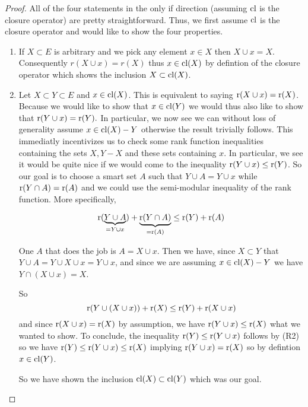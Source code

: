 \begin{proof}
    All of the four statements in the only if direction (assuming $\mathrm{cl}$ is the closure operator) are pretty straightforward. 
    Thus, we first assume $\mathrm{cl}$ is the closure operator and would like to show the four properties.

    \begin{enumerate}
        \item If $X\subset E$ is arbitrary and we pick any element $x \in X$ then $X \cup x = X$. Consequently $r(X \cup x)= r(X)$ thus $x \in \mathrm{cl}(X)$ by defintion of the closure operator which shows the inclusion $X \subset \mathrm{cl}(X)$.

        \item Let $X \subset Y \subset E$
        and $x \in \mathrm{cl}(X)$. This is equivalent to saying $\text{r}(X \cup x) = \text{r}(X)$. Because we would like to show that $x \in \mathrm{cl}(Y)$ we would thus also like to show that $\text{r}(Y \cup x) = \text{r}(Y).$ In particular, we now see we can without loss of generality assume $x \in \mathrm{cl}(X) - Y$ otherwise the result trivially follows. This immediatly incentivizes us to check some rank function inequalities containing the sets $X, Y - X$ and these sets containing $x.$ In particular, we see it would be quite nice if we would come to the inequality 
        $\text{r}(Y\cup x) \leq \text{r}(Y)$.
        So our goal is to choose a smart set $A$ such that $Y \cup A = Y \cup x$ while $\text{r}(Y \cap A) = \text{r}(A)$ and we could use the semi-modular inequality of the rank function. More specifically,

        $$\text{r}(\underbrace{Y \cup A}_{ = Y  \cup x}) + \underbrace{\text{r}(Y \cap A)}_{ = \text{r}(A)} \leq \text{r}(Y) + \text{r}(A)$$

        One $A$ that does the job is $A = X \cup x.$ Then we have, since $X \subset Y$ that $Y \cup A = Y \cup X \cup x = Y \cup x$, and since we are assuming $x \in \mathrm{cl}(X) - Y$ we have $Y \cap (X \cup x) = X $.

        So $$\text{r}(Y\cup (X \cup x)) + \text{r}(X) \leq \text{r}(Y) + \text{r}(X \cup x)$$ and since $\text{r}(X \cup x) = \text{r}(X)$ by assumption, we have 
        $\text{r}(Y \cup x)\leq \text{r}(X)$ what we wanted to show. To conclude, the inequality $\text{r}(Y) \leq \text{r}(Y \cup x)$ follows by (R2) so we have $\text{r}(Y) \leq \text{r}(Y\cup x) \leq \text{r}(X)$ implying $\text{r}(Y \cup x ) = \text{r}(X)$ so by defintion $x \in \mathrm{cl}(Y)$.

            So we have shown the inclusion $\mathrm{cl}(X) \subset \mathrm{cl}(Y)$ which was our goal.


\end{enumerate}
\end{proof}

